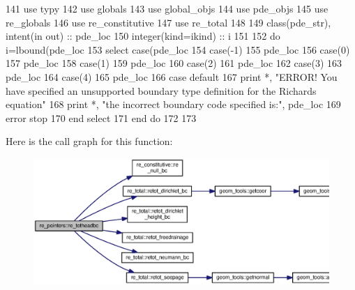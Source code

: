 \begin{DoxyCode}
141       \textcolor{keywordtype}{use }typy
142       \textcolor{keywordtype}{use }globals
143       \textcolor{keywordtype}{use }global_objs
144       \textcolor{keywordtype}{use }pde_objs
145       \textcolor{keywordtype}{use }re_globals
146       \textcolor{keywordtype}{use }re_constitutive
147       \textcolor{keywordtype}{use }re_total
148       
149       \textcolor{keywordtype}{class}(pde_str), \textcolor{keywordtype}{intent(in out)} :: pde\_loc
150       \textcolor{keywordtype}{integer(kind=ikind)} :: i
151       
152       \textcolor{keywordflow}{do} i=lbound(pde\_loc%
153         \textcolor{keywordflow}{select case}(pde\_loc%
154           \textcolor{keywordflow}{case}(-1)
155               pde\_loc%
156           \textcolor{keywordflow}{case}(0)
157                 pde\_loc%
158           \textcolor{keywordflow}{case}(1)
159                 pde\_loc%
160           \textcolor{keywordflow}{case}(2)
161                 pde\_loc%
162           \textcolor{keywordflow}{case}(3)
163                 pde\_loc%
164           \textcolor{keywordflow}{case}(4)
165                 pde\_loc%
166 \textcolor{keywordflow}{          case default}
167                 print *, \textcolor{stringliteral}{"ERROR! You have specified an unsupported boundary type definition for the
       Richards equation"}
168                 print *, \textcolor{stringliteral}{"the incorrect boundary code specified is:"}, pde\_loc%
169                 error stop
170 \textcolor{keywordflow}{        end select}
171 \textcolor{keywordflow}{      end do}
172     
173     
\end{DoxyCode}


Here is the call graph for this function\+:\nopagebreak
\begin{figure}[H]
\begin{center}
\leavevmode
\includegraphics[width=350pt]{namespacere__pointers_ad0da880edec99cec0e70b76e0819172d_cgraph}
\end{center}
\end{figure}




